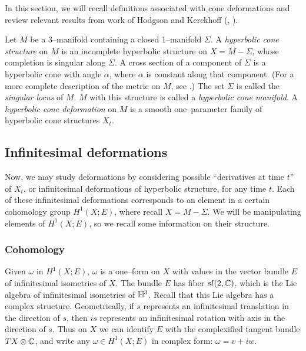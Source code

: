 In this section, we will recall definitions associated with cone
deformations and review relevant results from work of Hodgson and
Kerckhoff (\cite{hk:cone-rigid}, \cite{hk:univ}).

\begin{define}
Let $M$ be a 3--manifold containing a closed 1--manifold $\Sigma$.  A
\emph{hyperbolic cone structure} on $M$ is an incomplete hyperbolic
structure on $X=M-\Sigma$, whose completion is singular along
$\Sigma$.  A cross section of a component of $\Sigma$ is a hyperbolic
cone with angle $\alpha$, where $\alpha$ is constant along that
component.  (For a more complete description of the metric on $M$, see
\cite{hk:cone-rigid}.)  The set $\Sigma$ is called the \emph{singular
locus} of $M$.  $M$ with this structure is called a \emph{hyperbolic
cone manifold}.  A \emph{hyperbolic cone deformation} on $M$ is a
smooth one--parameter family of hyperbolic cone structures $X_t$.
\label{def:cone-deform}
\end{define}

\subsection{Infinitesimal deformations}
Now, we may study deformations by considering possible ``derivatives
at time $t$'' of $X_t$, or infinitesimal deformations of hyperbolic
structure,
for any time $t$.
Each of these infinitesimal deformations corresponds to an element in
a certain cohomology group $H^1(X; E)$, where recall $X=M-\Sigma$.  We
will be manipulating elements of $H^1(X;E)$, so we recall some
information on their structure.




\subsubsection{Cohomology}

Given $\omega$ in $H^1(X;E)$, $\omega$ is a one--form on $X$ with
values in the vector bundle $E$ of infinitesimal isometries of $X$.
The bundle $E$ has fiber $sl(2,{\mathbb{C}})$, which is the {L}ie algebra of
infinitesimal isometries of ${\mathbb{H}}^3$.  Recall that this {L}ie algebra
has a complex structure.  Geometrically, if $s$ represents an
infinitesimal translation in the direction of $s$, then $i s$
represents an infinitesimal rotation with axis in the direction of
$s$.  Thus on $X$ we can identify $E$ with the complexified tangent
bundle $TX \otimes {\mathbb{C}}$, and write any $\omega \in H^1(X;E)$ in
complex form: $\omega = v + iw$.

